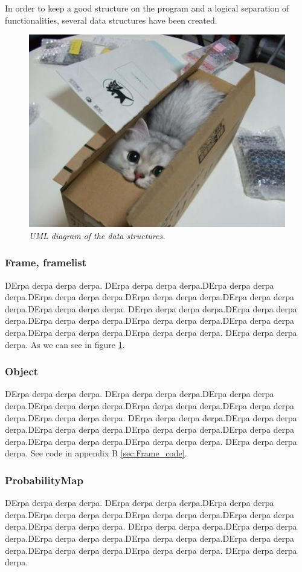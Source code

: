 In order to keep a good structure on the program and a logical separation of functionalities, several data structures have been created.

\begin{figure}[htb]
	\centering
	\includegraphics[width=\linewidth]{images/acatisfinetoo}
	\caption{\textit{UML diagram of the data structures.}}
	\label{fig:UML_fig} %
\end{figure}



\subsubsection{Frame, framelist}
DErpa derpa derpa derpa. DErpa derpa derpa derpa.DErpa derpa derpa derpa.DErpa derpa derpa derpa.DErpa derpa derpa derpa.DErpa derpa derpa derpa.DErpa derpa derpa derpa.
DErpa derpa derpa derpa.DErpa derpa derpa derpa.DErpa derpa derpa derpa.DErpa derpa derpa derpa.DErpa derpa derpa derpa.DErpa derpa derpa derpa.DErpa derpa derpa derpa.
DErpa derpa derpa derpa. As we can see in figure \ref{fig:UML_fig}. %

\subsubsection{Object}
DErpa derpa derpa derpa. DErpa derpa derpa derpa.DErpa derpa derpa derpa.DErpa derpa derpa derpa.DErpa derpa derpa derpa.DErpa derpa derpa derpa.DErpa derpa derpa derpa.
DErpa derpa derpa derpa.DErpa derpa derpa derpa.DErpa derpa derpa derpa.DErpa derpa derpa derpa.DErpa derpa derpa derpa.DErpa derpa derpa derpa.DErpa derpa derpa derpa.
DErpa derpa derpa derpa. See code in appendix B \ref{sec:Frame_code}.

\subsubsection{ProbabilityMap}
DErpa derpa derpa derpa. DErpa derpa derpa derpa.DErpa derpa derpa derpa.DErpa derpa derpa derpa.DErpa derpa derpa derpa.DErpa derpa derpa derpa.DErpa derpa derpa derpa.
DErpa derpa derpa derpa.DErpa derpa derpa derpa.DErpa derpa derpa derpa.DErpa derpa derpa derpa.DErpa derpa derpa derpa.DErpa derpa derpa derpa.DErpa derpa derpa derpa.
DErpa derpa derpa derpa.
